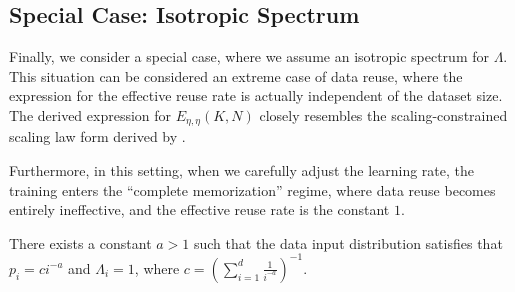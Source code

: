 

\iffalse
\subsection{Special Case: Isotropic Spectrum}

Finally, we consider a special case, where we assume an isotropic spectrum for $\Lambda$. This situation can be considered an extreme case of data reuse, where the expression for the effective reuse rate is actually independent of the dataset size. The derived expression for $E_{\eta, \eta}(K, N)$ closely resembles the scaling-constrained scaling law form derived by \citet{muennighoff2023scaling}. 

Furthermore, in this setting, when we carefully adjust the learning rate, the training enters the ``complete memorization'' regime, where data reuse becomes entirely ineffective, and the effective reuse rate is the constant $1$.
\begin{assumption} \label{asp:b=0}
    There exists a constant $a>1$ such that the data input distribution satisfies that $p_i = c i^{-a} $ and $\Lambda_i = 1$, where $c = \left(\sum_{i=1}^d\frac{1}{i^{-a}}\right)^{-1}$.
\end{assumption}

